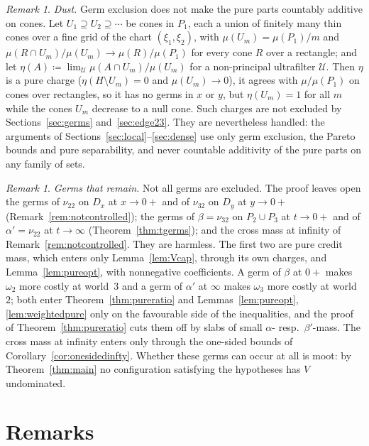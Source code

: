 \documentclass[11pt]{article}
\theoremstyle{definition}\newtheorem{definition}[theorem]{Definition}
\theoremstyle{remark}\newtheorem{remark}[theorem]{Remark}
\begin{document}
\begin{remark}\label{rem:dust}
\emph{Dust.} Germ exclusion does not make the pure parts countably additive
on cones. Let $U_1\supseteq U_2\supseteq\cdots$ be cones in $P_1$, each a
union of finitely many thin cones over a fine grid of the chart
$(\xi_1,\xi_2)$, with $\mu(U_m)=\mu(P_1)/m$ and
$\mu(R\cap U_m)/\mu(U_m)\to\mu(R)/\mu(P_1)$ for every cone $R$ over a
rectangle; and let $\eta(A)\coloneqq\lim_{\mathcal U}\mu(A\cap U_m)/\mu(U_m)$
for a non-principal ultrafilter $\mathcal U$. Then $\eta$ is a pure charge
($\eta(H\setminus U_m)=0$ and $\mu(U_m)\to0$), it agrees with
$\mu/\mu(P_1)$ on cones over rectangles, so it has no germs in $x$ or $y$,
but $\eta(U_m)=1$ for all $m$ while the cones $U_m$ decrease to a null cone.
Such charges are not excluded by Sections~\ref{sec:germs}
and~\ref{sec:edge23}. They are nevertheless handled: the arguments of
Sections~\ref{sec:local}--\ref{sec:dense} use only germ exclusion, the
Pareto bounds and pure separability, and never countable additivity of the
pure parts on any family of sets.
\end{remark}

\begin{remark}\label{rem:harmless}
\emph{Germs that remain.} Not all germs are excluded. The proof leaves open
the germs of $\nu_{22}$ on $D_x$ at $x\to0+$ and of $\nu_{32}$ on $D_y$ at
$y\to0+$ (Remark~\ref{rem:notcontrolled}); the germs of $\beta=\nu_{32}$ on
$P_2\cup P_3$ at $t\to0+$ and of $\alpha'=\nu_{22}$ at $t\to\infty$
(Theorem~\ref{thm:tgerms}); and the cross mass at infinity of
Remark~\ref{rem:notcontrolled}. They are harmless. The first two are pure
credit mass, which enters only Lemma~\ref{lem:Vcap}, through its own charges,
and Lemma~\ref{lem:pureopt}, with nonnegative coefficients. A germ of
$\beta$ at $0+$ makes $\omega_2$ more costly at world~$3$ and a germ of
$\alpha'$ at $\infty$ makes $\omega_3$ more costly at world~$2$; both enter
Theorem~\ref{thm:pureratio} and Lemmas~\ref{lem:pureopt},
\ref{lem:weightedpure} only on the favourable side of the inequalities, and
the proof of Theorem~\ref{thm:pureratio} cuts them off by slabs of small
$\alpha$- resp.\ $\beta'$-mass. The cross mass at infinity enters only
through the one-sided bounds of Corollary~\ref{cor:onesidedinfty}. Whether
these germs can occur at all is moot: by Theorem~\ref{thm:main} no
configuration satisfying the hypotheses has $V$ undominated.
\end{remark}

\section{Remarks}\label{sec:remarks}
\end{document}
